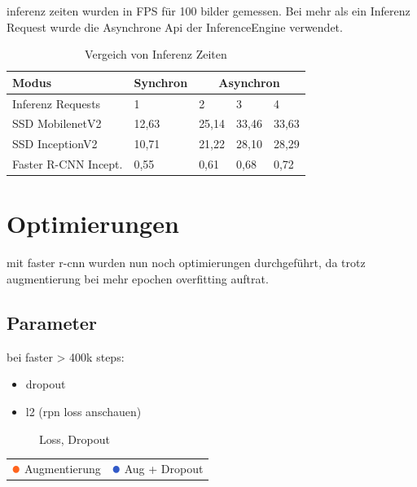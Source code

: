 inferenz zeiten wurden in FPS für 100 bilder gemessen. Bei 
mehr als ein Inferenz Request wurde die Asynchrone Api der InferenceEngine 
verwendet.


\begin{table}[htb]
  \centering
  \label{table:infer_zeit}
  \begin{tabular}{m{}|m{}<{\centering}|m{}<{\centering}|m{}<{\centering}|m{}<{\centering}}
  \hline
  Modus                & Synchron & \multicolumn{3}{c}{Asynchron} \\ \hline
  Inferenz Requests    & 1        & 2        & 3        & 4        \\ \hline\hline
  SSD MobilenetV2      & 12,63    & 25,14    & 33,46    & 33,63    \\
  SSD InceptionV2      & 10,71    & 21,22    & 28,10    & 28,29    \\
  Faster R-CNN Incept. & 0,55     & 0,61     & 0,68     & 0,72     \\ \hline
  \end{tabular}
  \caption{Vergeich von Inferenz Zeiten}
\end{table}


\section{Optimierungen}
mit faster r-cnn wurden nun noch optimierungen durchgeführt, da 
trotz augmentierung bei mehr epochen overfitting auftrat.

\subsection{Parameter}
bei faster > 400k steps:
\begin{itemize}
  \item dropout
  \item l2 (rpn loss anschauen)
\end{itemize}

\begin{figure}[htb]
  \centering
  \label{plot:dropout}
  \def\svgwidth{0.6\textwidth}
  
  \caption{Loss, Dropout}
\end{figure}

\begin{table}[htb]
  \centering
  \begin{tabular}{m{}l}
      $\color[RGB]{255,100,30}\medbullet$  Augmentierung & $\color[RGB]{50,90,200}\medbullet$  Aug + Dropout
  \end{tabular}    
\end{table}

